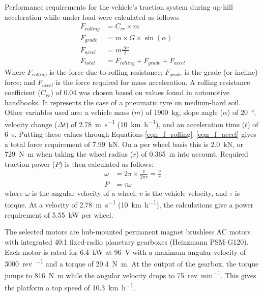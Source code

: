 \documentclass[preprint,authoryear,12pt]{elsarticle}
\begin{document}
        Performance requirements for the vehicle's traction system during up-hill acceleration while under load were calculated as follows:
        \begin{align}
        \label{eqn_f_rolling}
        F_{rolling} &= C_{rr} \times m\\
        F_{grade} &= m \times G \times \sin(\alpha)\\
        F_{accel} &= m \frac{\Delta v}{t}\\
        \label{eqn_f_accel}
        F_{total} &= F_{rolling} + F_{grade} + F_{accel}
        \end{align}
        Where $F_{rolling}$ is the force due to rolling resistance; $F_{grade}$ is the grade (or incline) force; and $F_{accel}$ is the force required for mass acceleration.
        A rolling resistance coefficient ($C_{rr}$) of 0.04 was chosen based on values found in automotive handbooks.
        It represents the case of a pneumatic tyre on medium-hard soil.
        Other variables used are: a vehicle mass ($m$) of \SI{1900}{\kilo\gram}, slope angle ($\alpha$) of \SI{20}{\degree}, velocity change ($\Delta t$) of \SI{2.78}{\metre\per\second} (\SI{10}{\kilo\meter\per\hour}), and an acceleration time ($t$) of \SI{6}{\second}.
        Putting these values through Equations \ref{eqn_f_rolling}--\ref{eqn_f_accel} gives a total force requirement of \SI{7.99}{\kilo\newton}.
        On a per wheel basis this is \SI{2.0}{\kilo\newton}, or \SI{729}{\newton\meter} when taking the wheel radius ($r$) of \SI{0.365}{\meter} into account.
        Required traction power ($P$) is then calculated as follows:
        \begin{align}
        \label{eqn_f_power}
        \omega &= 2 \pi \times \frac{v}{2 \pi r} = \frac{v}{r}\\
        P &= \tau \omega
        \end{align}
        where $\omega$ is the angular velocity of a wheel, $v$ is the vehicle velocity, and $\tau$ is torque.
        At a velocity of \SI{2.78}{\meter\per\second} (\SI{10}{\kilo\meter\per\hour}), the calculations give a power requirement of \SI{5.55}{\kilo\watt} per wheel.

        The selected motors are hub-mounted permanent magnet brushless AC motors with integrated 40:1 fixed-radio planetary gearboxes (Heinzmann PSM-G120).
        Each motor is rated for \SI{6.4}{\kilo\watt} at \SI{96}{\volt} with a maximum angular velocity of \SI{3000}{rev\per\min} and a torque of \SI{20.4}{\newton\meter}.
        At the output of the gearbox, the torque jumps to \SI{816}{\newton\meter} while the angular velocity drops to \SI{75}{rev\per\minute}.
        This gives the platform a top speed of \SI{10.3}{\kilo\meter\per\hour}.
\end{document}
